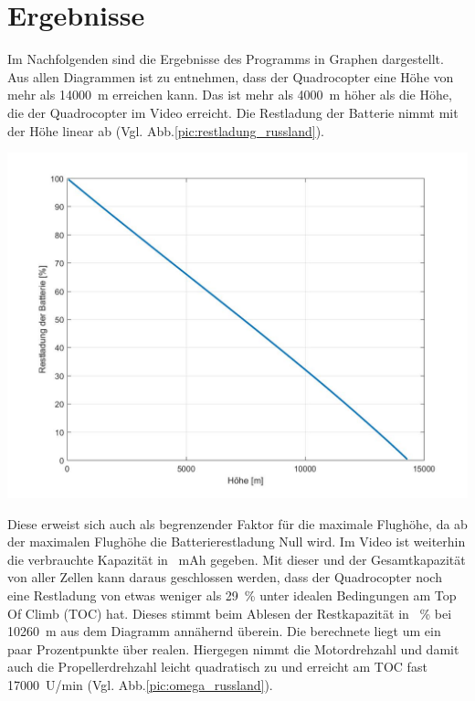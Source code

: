 \section{Ergebnisse}
\label{sec:ergebnisse_quadrocopter}
Im Nachfolgenden sind die Ergebnisse des Programms in Graphen dargestellt. Aus allen Diagrammen ist zu entnehmen, dass der Quadrocopter eine Höhe von mehr als \SI{14000}{m} erreichen kann. Das ist mehr als \SI{4000}{m} höher als die Höhe, die der Quadrocopter im Video erreicht.
Die Restladung der Batterie nimmt mit der Höhe linear ab (Vgl. Abb.\ref{pic:restladung_russland}).  
\begin{center}
	\includegraphics[scale=0.3]{Diagramme/C_Rest_V.jpg}
	\label{pic:restladung_russland}
\end{center}
Diese erweist sich auch als begrenzender Faktor für die maximale Flughöhe, da ab der maximalen Flughöhe die Batterierestladung Null wird. Im Video ist weiterhin die verbrauchte Kapazität in \SI{}{mAh} gegeben. Mit dieser und der Gesamtkapazität von aller Zellen kann daraus geschlossen werden, dass der Quadrocopter noch eine Restladung von etwas weniger als \SI{29}{\%} unter idealen Bedingungen am Top Of Climb (TOC) hat. Dieses stimmt beim Ablesen der Restkapazität in \SI{}{\%} bei \SI{10260}{m} aus dem Diagramm annähernd überein. Die berechnete liegt um ein paar Prozentpunkte über realen.
Hiergegen nimmt die Motordrehzahl und damit auch die Propellerdrehzahl leicht quadratisch zu und erreicht am TOC fast \SI{17000}{U/min} (Vgl. Abb.\ref{pic:omega_russland}).  
